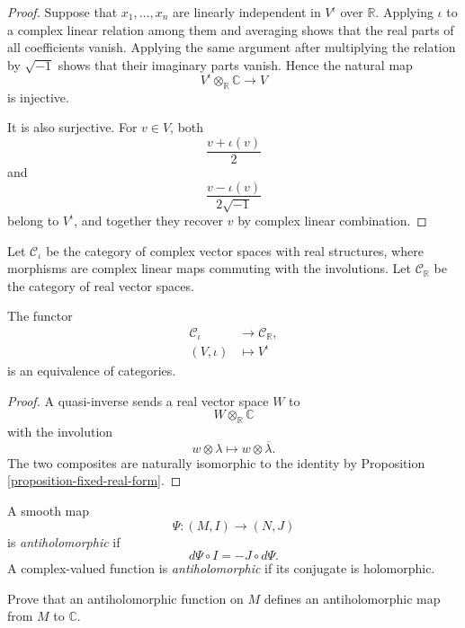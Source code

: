 \begin{proof}
Suppose that $x_1,\ldots,x_n$ are linearly
independent in $V^\iota$ over $\mathbb{R}$.
Applying $\iota$ to a complex linear
relation among them and averaging shows that
the real parts of all coefficients vanish.
Applying the same argument after multiplying
the relation by $\sqrt{-1}$ shows that their
imaginary parts vanish. Hence the natural map
$$
V^\iota\otimes_{\mathbb{R}}\mathbb{C}
\longrightarrow V
$$
is injective.

It is also surjective. For $v\in V$, both
$$
\frac{v+\iota(v)}{2}
$$
and
$$
\frac{v-\iota(v)}{2\sqrt{-1}}
$$
belong to $V^\iota$, and together they
recover $v$ by complex linear combination.
\end{proof}

Let $\mathcal{C}_\iota$ be the category of
complex vector spaces with real structures,
where morphisms are complex linear maps
commuting with the involutions. Let
$\mathcal{C}_{\mathbb{R}}$ be the category
of real vector spaces.

\begin{theorem}
\label{theorem-real-structure-category}
The functor
$$
\begin{aligned}
\mathcal{C}_\iota
&\longrightarrow\mathcal{C}_{\mathbb{R}},\\
(V,\iota)&\longmapsto V^\iota
\end{aligned}
$$
is an equivalence of categories.
\end{theorem}

\begin{proof}
A quasi-inverse sends a real vector space
$W$ to
$$
W\otimes_{\mathbb{R}}\mathbb{C}
$$
with the involution
$$
w\otimes\lambda
\longmapsto
w\otimes\overline{\lambda}.
$$
The two composites are naturally isomorphic
to the identity by Proposition
\ref{proposition-fixed-real-form}.
\end{proof}

\begin{definition}
\label{definition-antiholomorphic-map}
A smooth map
$$
\Psi:(M,I)\longrightarrow(N,J)
$$
is {\it antiholomorphic} if
$$
d\Psi\circ I=-J\circ d\Psi.
$$
A complex-valued function is
{\it antiholomorphic} if its conjugate is
holomorphic.
\end{definition}

\begin{exercise}
\label{exercise-antiholomorphic-function}
Prove that an antiholomorphic function on
$M$ defines an antiholomorphic map from $M$
to $\mathbb{C}$.
\end{exercise}

